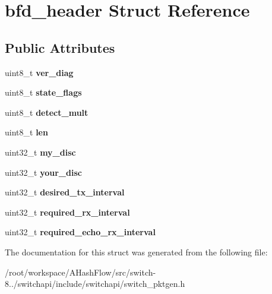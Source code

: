 \hypertarget{structbfd__header}{\section{bfd\+\_\+header Struct Reference}
\label{structbfd__header}
}
\subsection*{Public Attributes}
\begin{DoxyCompactItemize}
\item 
\hypertarget{structbfd__header_ae6b6924f20ebc2817f9e5c4a0ad28709}{uint8\+\_\+t {\bfseries ver\+\_\+diag}}\label{structbfd__header_ae6b6924f20ebc2817f9e5c4a0ad28709}

\item 
\hypertarget{structbfd__header_a5629e7edfff0eb7e1fa45587303f7f4a}{uint8\+\_\+t {\bfseries state\+\_\+flags}}\label{structbfd__header_a5629e7edfff0eb7e1fa45587303f7f4a}

\item 
\hypertarget{structbfd__header_afedd9241475786b0c2028555bc8ea0c4}{uint8\+\_\+t {\bfseries detect\+\_\+mult}}\label{structbfd__header_afedd9241475786b0c2028555bc8ea0c4}

\item 
\hypertarget{structbfd__header_a8e4fad736bddddfbdedcd8d827332538}{uint8\+\_\+t {\bfseries len}}\label{structbfd__header_a8e4fad736bddddfbdedcd8d827332538}

\item 
\hypertarget{structbfd__header_ae6604db7751286dcd811928d6c93dca6}{uint32\+\_\+t {\bfseries my\+\_\+disc}}\label{structbfd__header_ae6604db7751286dcd811928d6c93dca6}

\item 
\hypertarget{structbfd__header_a51ba5b0c83207d79fd86393b6098dc10}{uint32\+\_\+t {\bfseries your\+\_\+disc}}\label{structbfd__header_a51ba5b0c83207d79fd86393b6098dc10}

\item 
\hypertarget{structbfd__header_addd058e421e18f7c494dee60cf6c74c9}{uint32\+\_\+t {\bfseries desired\+\_\+tx\+\_\+interval}}\label{structbfd__header_addd058e421e18f7c494dee60cf6c74c9}

\item 
\hypertarget{structbfd__header_a8ea4344607ab83a0ecabe270b877983f}{uint32\+\_\+t {\bfseries required\+\_\+rx\+\_\+interval}}\label{structbfd__header_a8ea4344607ab83a0ecabe270b877983f}

\item 
\hypertarget{structbfd__header_aaa393dde1eabdeeaa5673d557496a006}{uint32\+\_\+t {\bfseries required\+\_\+echo\+\_\+rx\+\_\+interval}}\label{structbfd__header_aaa393dde1eabdeeaa5673d557496a006}

\end{DoxyCompactItemize}


The documentation for this struct was generated from the following file\+:\begin{DoxyCompactItemize}
\item 
/root/workspace/\+A\+Hash\+Flow/src/switch-\/8../switchapi/include/switchapi/switch\+\_\+pktgen.\+h\end{DoxyCompactItemize}
